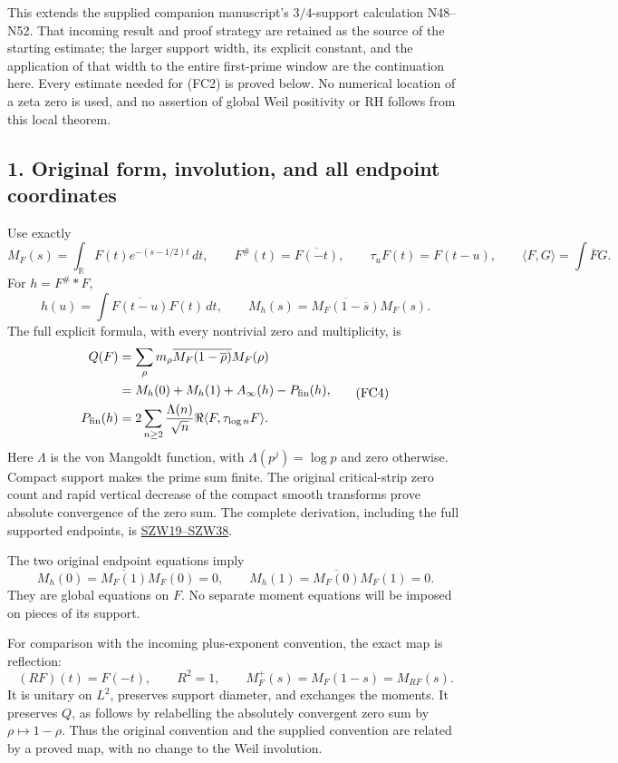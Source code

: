 \documentclass[
  10pt,
  a4paper,
]{article}
\begin{document}
This extends the supplied companion manuscript's \(3/4\)-support
calculation N48--N52. That incoming result and proof strategy are
retained as the source of the starting estimate; the larger support
width, its explicit constant, and the application of that width to the
entire first-prime window are the continuation here. Every estimate
needed for (FC2) is proved below. No numerical location of a zeta zero
is used, and no assertion of global Weil positivity or RH follows from
this local theorem.

\subsection{1. Original form, involution, and all endpoint
coordinates}\label{original-form-involution-and-all-endpoint-coordinates}

Use exactly \[
M_F(s)=\int_{\mathbb R}F(t)e^{-(s-1/2)t}\,dt,\qquad
F^\#(t)=\overline{F(-t)},\qquad
\tau_uF(t)=F(t-u),\qquad
\langle F,G\rangle=\int\overline F G.
\tag{FC3}
\] For \(h=F^\#*F\), \[
h(u)=\int\overline{F(t-u)}F(t)\,dt,\qquad
M_h(s)=\overline{M_F(1-\overline s)}M_F(s).
\] The full explicit formula, with every nontrivial zero and
multiplicity, is \[
\begin{aligned}
Q(F)&=\sum_\rho m_\rho
\overline{M_F(1-\overline\rho)}M_F(\rho)\\
&=M_h(0)+M_h(1)+A_\infty(h)-P_{\rm fin}(h),\\
P_{\rm fin}(h)&=
2\sum_{n\ge2}\frac{\Lambda(n)}{\sqrt n}
\Re\langle F,\tau_{\log n}F\rangle.
\end{aligned}
\tag{FC4}
\] Here \(\Lambda\) is the von Mangoldt function, with
\(\Lambda(p^j)=\log p\) and zero otherwise. Compact support makes the
prime sum finite. The original critical-strip zero count and rapid
vertical decrease of the compact smooth transforms prove absolute
convergence of the zero sum. The complete derivation, including the full
supported endpoints, is
\href{https://github.com/KokunoYumeto/zeta-function-research-reader/blob/5a89872598df0902b7c1393cf8e4692ca3010a95/workbenches/splitzero-tandem/branches/tau-zero-prime-positivity/SUPPORTED_ZERO_PRIME_WEIL_DERIVATION.md}{SZW19--SZW38}.

The two original endpoint equations imply \[
M_h(0)=\overline{M_F(1)}M_F(0)=0,\qquad
M_h(1)=\overline{M_F(0)}M_F(1)=0.
\tag{FC5}
\] They are global equations on \(F\). No separate moment equations will
be imposed on pieces of its support.

For comparison with the incoming plus-exponent convention, the exact map
is reflection: \[
(RF)(t)=F(-t),\qquad R^2=1,\qquad
M_F^+(s)=M_F(1-s)=M_{RF}(s).
\tag{FC6}
\] It is unitary on \(L^2\), preserves support diameter, and exchanges
the moments. It preserves \(Q\), as follows by relabelling the
absolutely convergent zero sum by \(\rho\mapsto1-\rho\). Thus the
original convention and the supplied convention are related by a proved
map, with no change to the Weil involution.
\end{document}
